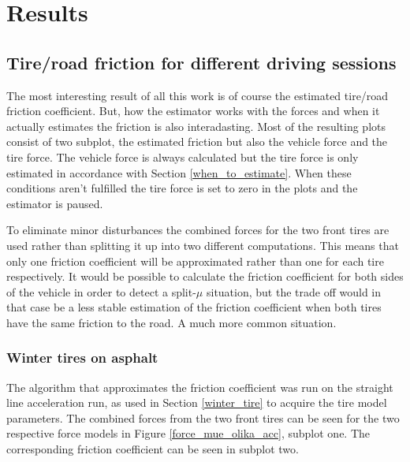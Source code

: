 \chapter{Results}
\label{chapter_five}

\section{Tire/road friction for different driving sessions}

The most interesting result of all this work is of course the estimated tire/road friction coefficient. But, how the estimator works with the forces and when it actually estimates the friction is also interadasting. Most of the resulting plots consist of two subplot, the estimated friction but also the vehicle force and the tire force. The vehicle force is always calculated but the tire force is only estimated in accordance with Section \ref{when_to_estimate}. When these conditions aren't fulfilled the tire force is set to zero in the plots and the estimator is paused.

To eliminate minor disturbances the combined forces for the two front tires are used rather than splitting it up into two different computations. This means that only one friction coefficient will be approximated rather than one for each tire respectively. It would be possible to calculate the friction coefficient for both sides of the vehicle in order to detect a split-$ \mu $ situation, but the trade off would in that case be a less stable estimation of the friction coefficient when both tires have the same friction to the road. A much more common situation.

\subsection{Winter tires on asphalt}
The algorithm that approximates the friction coefficient was run on the straight line acceleration run, as used in Section \ref{winter_tire} to acquire the tire model parameters. The combined forces from the two front tires can be seen for the two respective force models in Figure \ref{force_mue_olika_acc}, subplot one. The corresponding friction coefficient can be seen in subplot two. 

